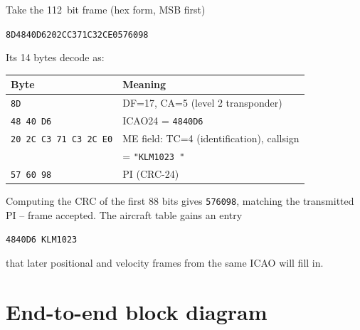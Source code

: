 \documentclass[11pt,a4paper]{article}
\begin{document}
Take the \SI{112}{bit} frame (hex form, MSB first)
\begin{center}
  \texttt{8D4840D6202CC371C32CE0576098}
\end{center}
Its 14 bytes decode as:

\begin{center}
\begin{tabular}{l l}
\toprule
Byte  & Meaning                                             \\
\midrule
\texttt{8D}                       & DF=17, CA=5 (level 2 transponder)             \\
\texttt{48\,40\,D6}                 & ICAO24 = \texttt{4840D6}                       \\
\texttt{20\,2C\,C3\,71\,C3\,2C\,E0}   & ME field: TC=4 (identification), callsign      \\
                                  & = \texttt{"KLM1023 "}                          \\
\texttt{57\,60\,98}                 & PI (CRC-24)                                    \\
\bottomrule
\end{tabular}
\end{center}

Computing the CRC of the first 88 bits gives \texttt{576098}, matching
the transmitted PI -- frame accepted.  The aircraft table gains an
entry
\begin{center}
\texttt{4840D6  KLM1023}
\end{center}
that later positional and velocity frames from the same ICAO will
fill in.

\section{End-to-end block diagram}
\end{document}
